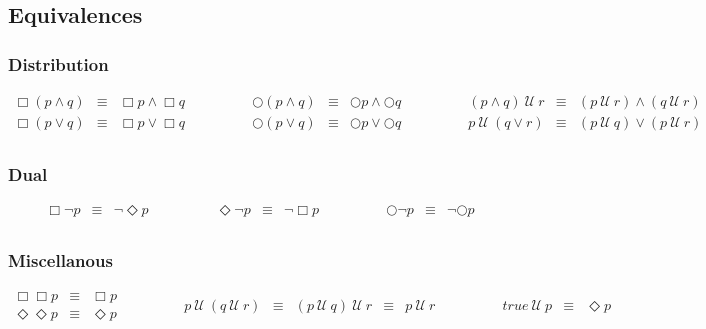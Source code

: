 \subsection{Equivalences}
\subsubsection{Distribution}
\[
  \begin{matrix}
    \Box (p \land q ) & \equiv & \Box p \land \Box q \\
    \Box (p \lor q ) & \equiv & \Box p \lor \Box q \\
  \end{matrix}
  \qquad \qquad
  \begin{matrix}
    \bigcirc (p \land q) & \equiv & \bigcirc p \land \bigcirc q \\
    \bigcirc (p \lor q) & \equiv & \bigcirc p \lor \bigcirc q \\
  \end{matrix}
  \qquad \qquad
  \begin{matrix}
    (p \land q) \ \mathcal{U} \ r & \equiv & (p \ \mathcal{U} \ r) \land (q \ \mathcal{U} \ r) \\
    p \ \mathcal{U} \ (q \lor r) & \equiv & (p \ \mathcal{U} \ q) \lor (p \ \mathcal{U} \ r) \\
  \end{matrix}
\]

\subsubsection{Dual}
\[
  \begin{matrix}
    \Box \neg p & \equiv & \neg \Diamond p \\
  \end{matrix}
  \qquad \qquad
  \begin{matrix}
    \Diamond \neg p & \equiv & \neg \Box p \\
  \end{matrix}
  \qquad \qquad
  \begin{matrix}
    \bigcirc \neg p & \equiv & \neg \bigcirc p \\
  \end{matrix}
\]
\subsubsection{Miscellanous}
\[
  \begin{matrix}
    \Box \Box p & \equiv & \Box p \\
    \Diamond \Diamond p & \equiv & \Diamond p \\
  \end{matrix}
  \qquad \qquad
  \begin{matrix}
    p \ \mathcal{U} \ (q \ \mathcal{U} \ r) & \equiv & (p \ \mathcal{U} \ q) \ \mathcal{U} \ r & \equiv & p \ \mathcal{U} \ r \\
  \end{matrix}
  \qquad \qquad
  \begin{matrix}
    true \ \mathcal{U} \ p & \equiv & \Diamond p \\
  \end{matrix}
\]

